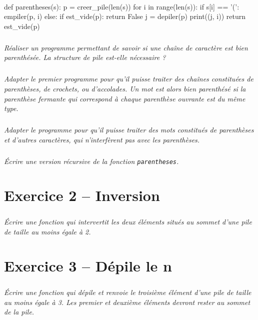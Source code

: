 \documentclass[10pt,fleqn]{article} %
\begin{document}
\begin{multicols}{2}
\ifprof
\begin{corrige}
~\\
\begin{python}
def parentheses(s):
    p = creer_pile(len(s))
    for i in range(len(s)):
    if s[i] == '(':
        empiler(p, i)
    else:
        if est_vide(p):
            return False
        j = depiler(p)
        print((j, i))
    return est_vide(p)
\end{python}
\end{corrige}
\else
\fi

\subparagraph{}
\textit{Réaliser un programme permettant de savoir si une chaîne de caractère est bien parenthésée. La structure de pile est-elle nécessaire ?}
\ifprof
\begin{corrige}
\end{corrige}
\else
\fi


\subparagraph{}
\textit{Adapter le premier programme pour qu'il puisse traiter des chaînes constituées de parenthèses, de crochets, ou d'accolades. Un mot est alors bien parenthésé si la parenthèse fermante qui correspond à chaque parenthèse ouvrante est du même type.}
\ifprof
\begin{corrige}
\end{corrige}
\else
\fi

\subparagraph{}
\textit{Adapter le programme pour qu’il puisse traiter des mots constitués de parenthèses et
d’autres caractères, qui n’interfèrent pas avec les parenthèses.}
\ifprof
\begin{corrige}
\end{corrige}
\else
\fi


\subparagraph{}
\textit{Écrire une version récursive de la fonction \texttt{parentheses}.}
\ifprof
\begin{corrige}
\end{corrige}
\else
\fi


\section*{Exercice 2 -- Inversion}
\subparagraph*{}
\setcounter{exo}{0}
\textit{Écrire une fonction qui intervertit les deux éléments situés au sommet d’une pile de taille
au moins égale à 2.}
\ifprof
\begin{corrige}
\end{corrige}
\else
\fi


\section*{Exercice 3 -- Dépile le n\ieme}
\setcounter{exo}{0}
\subparagraph*{}
\textit{Écrire une fonction qui dépile et renvoie le troisième élément d’une pile de taille au moins
égale à 3. Les premier et deuxième éléments devront rester au sommet de la pile.}
\ifprof
\begin{corrige}
\end{corrige}
\else
\fi


\end{multicols}
\end{document}
